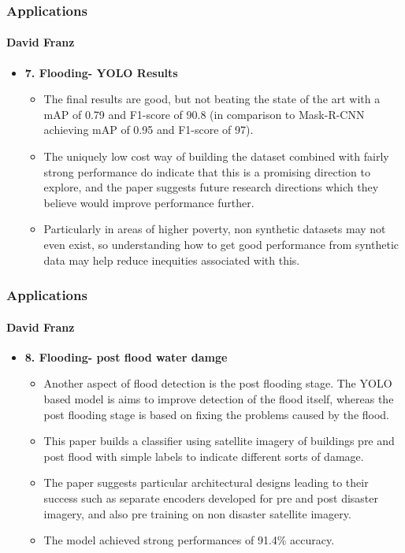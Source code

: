 \documentclass{beamer}
\newcommand{\namedframe}[3]{
  \begin{frame}
    \frametitle{#2}
    \framesubtitle{#1}
    #3
  \end{frame}
}
\begin{document}
\namedframe{David Franz}{Applications}{
\begin{itemize}
    \item \textbf{7. Flooding- YOLO Results}
    \begin{itemize}
        \item The final results are good, but not beating the state of the art with a mAP of 0.79 and F1-score of 90.8 (in comparison to Mask-R-CNN achieving mAP of 0.95 and F1-score of 97). 
        \item The uniquely low cost way of building the dataset combined with fairly strong performance do indicate that this is a promising direction to explore, and the paper suggests future research directions which they believe would improve performance further. 
        \item Particularly in areas of higher poverty, non synthetic datasets may not even exist, so understanding how to get good performance from synthetic data may help reduce inequities associated with this.
    \end{itemize}
\end{itemize}
}


\namedframe{David Franz}{Applications}{
\begin{itemize}
    \item \textbf{8. Flooding- post flood water damge}
    \begin{itemize}
        \item Another aspect of flood detection is the post flooding stage. The YOLO based model is aims to improve detection of the flood itself, whereas the post flooding stage is based on fixing the problems caused by the flood.
        \item This paper builds a classifier using satellite imagery of buildings pre and post flood with simple labels to indicate different sorts of damage.  
        \item         The paper suggests particular architectural designs leading to their success such as separate encoders developed for pre and post disaster imagery, and also pre training on non disaster satellite imagery. 
        \item The model achieved strong performances of 91.4\% accuracy. 
    \end{itemize}
\end{itemize}
}
\end{document}
